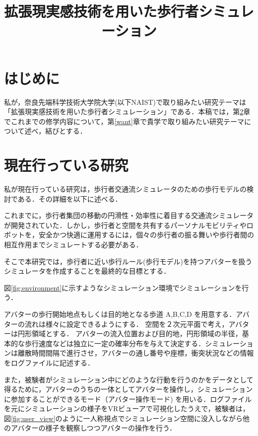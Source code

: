 \documentclass[twocolumn]{jarticle}%
\title{\vspace{5mm}\large{拡張現実感技術を用いた歩行者シミュレーション}\vspace{-15mm}}
\date{}
\begin{document}
\normalsize
\maketitle

\section{はじめに}
\thispagestyle{fancy}

私が，奈良先端科学技術大学院大学(以下NAIST)で取り組みたい研究テーマは「拡張現実感技術を用いた歩行者シミュレーション」である．本稿では，第\ref{current}章でこれまでの修学内容について，第\ref{want}章で貴学で取り組みたい研究テーマについて述べ，結びとする．

\vspace{-2mm}
\section{現在行っている研究}\label{current}
私が現在行っている研究は，歩行者交通流シミュレータのための歩行モデルの検討である．その詳細を以下に述べる．

これまでに，歩行者集団の移動の円滑性・効率性に着目する交通流シミュレータが開発されていた．しかし，歩行者と空間を共有するパーソナルモビリティやロボットを，安全かつ快適に運用するには，個々の歩行者の振る舞いや歩行者間の相互作用までシミュレートする必要がある．

そこで本研究では，歩行者に近い歩行ルール(歩行モデル)を持つアバターを扱うシミュレータを作成することを最終的な目標とする．


図\ref{fig:environment}に示すようなシミュレーション環境でシミュレーションを行う．

アバターの歩行開始地点もしくは目的地となる歩道 A,B,C,D を用意する．アバターの流れは様々に設定できるようにする．
空間を２次元平面で考え，アバターは円形領域とする． アバターの流入位置および目的地，円形領域の半径，基本的な歩行速度などは独立に一定の確率分布を与えて決定する．シミュレーションは離散時間間隔で進行させ，アバターの通し番号や座標，衝突状況などの情報をログファイルに記述する． 

また，被験者がシミュレーション中にどのような行動を行うのかをデータとして得るために，アバターのうちの一体としてアバターを操作し，シミュレーションに参加することができるモード（アバター操作モード) を用いる．ログファイルを元にシミュレーションの様子をVRビューアで可視化したうえで，被験者は，図\ref{fig:user_view}のように一人称視点でシミュレーション空間に没入しながら他のアバターの様子を観察しつつアバターの操作を行う．
\end{document}

